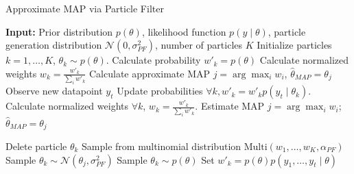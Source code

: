 \begin{algorithm}
\begin{algorithmic}[1]
\caption{Approximate MAP via Particle Filter}
\label{alg:pf}
\STATE \textbf{Input:} Prior distribution $p(\theta)$, likelihood function $p(y \mid \theta)$, particle generation distribution $\mathcal{N}(0,\sigma_{PF}^2)$, number of particles $K$
\STATE Initialize particles $k = 1,\hdots,K$, $\theta_k \sim p(\theta)$.
\STATE Calculate probability $w'_k = p(\theta)$
\STATE Calculate normalized weights $w_k = \frac{w'_k}{\sum_i w'_k}$
\STATE Calculate approximate MAP $j = \arg\max_i w_i$, $\hat \theta_{MAP} = \theta_j$
	\STATE Observe new datapoint $y_t$
	\STATE Update probabilities $\forall k, w'_k = w'_k p(y_t \mid \theta_k)$.
	\STATE Calculate normalized weights $\forall k$, $w_k = \frac{w'_k}{\sum_i w'_k}$.
	\STATE Estimate MAP $j = \arg\max_i w_i$; $\hat \theta_{MAP} = \theta_j$
		
			\STATE Delete particle $\theta_k$
			\STATE Sample from multinomial distribution $\text{Multi}(w_1,\hdots, w_K, \alpha_{PF})$ \label{line:res}
				\STATE Sample $\theta_k \sim \mathcal{N}(\theta_j, \sigma^2_{PF})$
			\ELSE
				\STATE Sample $\theta_k \sim p(\theta)$
			\ENDIF
			\STATE Set $w'_k = p(\theta)p(y_1,\hdots,y_t \mid \theta)$ 
	\ENDFOR
\ENDWHILE
\end{algorithmic}
\end{algorithm}









